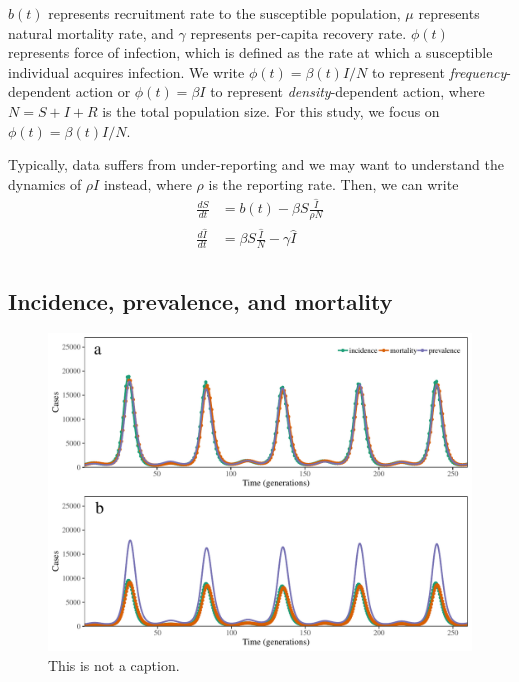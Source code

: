\documentclass{article}
\begin{document}
$b(t)$ represents recruitment rate to the susceptible population, $\mu$ represents natural mortality rate, and $\gamma$ represents per-capita recovery rate.
$\phi(t)$ represents force of infection, which is defined as the rate at which a susceptible individual acquires infection.
We write $\phi(t) = \beta(t) I/N$ to represent \textit{frequency}-dependent action or $\phi(t) = \beta I$ to represent \textit{density}-dependent action, where $N = S + I + R$ is the total population size.
For this study, we focus on $\phi(t) = \beta(t)I/N$.

Typically, data suffers from under-reporting and we may want to understand the dynamics of $\rho I$ instead, where $\rho$ is the reporting rate.
Then, we can write
\begin{equation}
\begin{aligned}
\frac{dS}{dt} &= b(t) - \beta S \frac{\hat{I}}{\rho N} \\
\frac{d\hat{I}}{dt} &= \beta S \frac{\hat{I}}{N} - \gamma \hat{I} \\
\end{aligned}
\label{eq:rhosir}
\end{equation}

\subsection{Incidence, prevalence, and mortality}

\begin{figure}[t]
\includegraphics[width=\textwidth]{../figure/inc_prev_mort.pdf}
\caption{This is not a caption.}
\end{figure}
\end{document}
